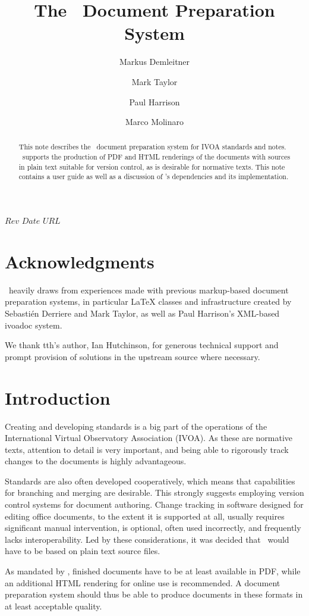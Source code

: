 \documentclass[11pt,a4paper]{ivoa}
\title{The \ivoatex\ Document Preparation System}
\author[http://www.ivoa.net/cgi-bin/twiki/bin/view/IVOA/MarkusDemleitner]{Markus Demleitner}
\author[http://www.ivoa.net/cgi-bin/twiki/bin/view/IVOA/MarkTaylor]{Mark Taylor}
\author[http://www.ivoa.net/cgi-bin/twiki/bin/view/IVOA/PaulHarrison]{Paul Harrison}
\author[http://www.ivoa.net/cgi-bin/twiki/bin/view/IVOA/MarcoMolinaro]{Marco Molinaro}
\begin{document}
\SVN$Rev$
\SVN$Date$
\SVN$URL$

\begin{abstract}
This note describes the \ivoatex\ document preparation system for IVOA
standards and notes.  \ivoatex\ supports the production of
PDF and HTML renderings of the documents with sources in
plain text suitable for version control, as is desirable for normative
texts.  This note contains a user guide as well as a discussion of 
\ivoatex's dependencies and its implementation.
\end{abstract}


\section*{Acknowledgments}

\ivoatex\ heavily draws from experiences made with previous markup-based
document preparation systems, in particular LaTeX classes and
infrastructure created by Sebasti\'en Derriere and Mark Taylor, as well
as Paul Harrison's XML-based ivoadoc system.

We thank tth's author, Ian Hutchinson, for generous technical support
and prompt provision of solutions in the upstream source where necessary.

\section{Introduction}

Creating and developing standards is a  big part of the operations of
the International Virtual Observatory Association (IVOA).
As these are normative texts, attention to detail is very important, and
being able to rigorously track changes to the documents is highly
advantageous.  

Standards are also often developed cooperatively, which means that
capabilities for branching and merging are desirable.  This strongly
suggests employing version control systems for document authoring.
Change tracking in software designed for editing office documents, to
the extent it is supported at all, usually requires significant
manual intervention, is optional, often used incorrectly, and frequently
lacks interoperability.  Led by these considerations, it was decided that
\ivoatex\ would have to be based on plain text source files.

As mandated by \citet{std:docSTD}, finished documents have to be at
least available in PDF, while an additional HTML rendering for online
use is recommended.  A document preparation system should thus be
able  to produce documents in these formats in at least acceptable
quality.
\end{document}
